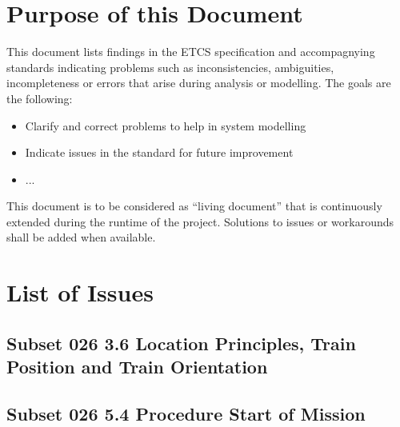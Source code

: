 \documentclass{template/openetcs_article}
\begin{document}
\tableofcontents
\newpage



\section{Purpose of this Document}

  This document lists findings in the ETCS specification and accompagnying standards indicating problems such as inconsistencies, ambiguities, incompleteness or errors that arise during analysis or modelling. The goals are the following:
  \begin{itemize}
    \item Clarify and correct problems to help in system modelling
    \item Indicate issues in the standard for future improvement
    \item ... 
  \end{itemize}

This document is to be considered as ``living document'' that is continuously extended during the runtime of the project. Solutions to issues or workarounds shall be added when available.

\section{List of Issues}

\subsection{Subset 026 3.6 Location Principles, Train Position and Train Orientation}




\subsection{Subset 026 5.4 Procedure Start of Mission}








\begin{thebibliography}{9}


\end{thebibliography}

\end{document}
